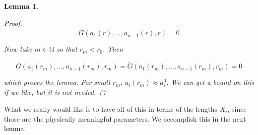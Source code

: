\documentclass[12pt]{article}
\def\N{{\mathbb N}}
\newtheorem{lemma}{Lemma}
\begin{document}
\begin{lemma}
\begin{proof}
\[
\tilde{G}(a_1(r), \dots, a_{n-1}(r), r) = 0
\]

Now take $m \in \N$ so that $r_m < r_0$. Then

\[
G(a_1(r_m), \dots, a_{n-1}(r_m), r_m) = \tilde{G}(a_1(r_m), \dots, a_{n-1}(r_m), r_m) = 0
\]

which proves the lemma. For small $r_m$, $a_i(r_m) \approx a_i^0$. We can get a bound on this if we like, but it is not needed.

\end{proof}
\end{lemma}

What we really would like is to have all of this in terms of the lengths $X_i$, since those are the physically meaningful parameters. We accomplish this in the next lemma.

\end{document}
